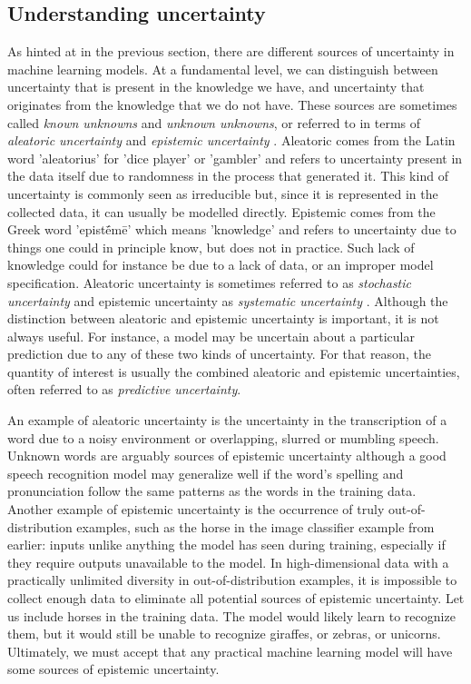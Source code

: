 \subsection{Understanding uncertainty} \label{subsec:understanding-uncertainty}
% 
% 
As hinted at in the previous section, there are different sources of uncertainty in machine learning models. 
At a fundamental level, we can distinguish between uncertainty that is present in the knowledge we have, and uncertainty that originates from the knowledge that we do not have.
These sources are sometimes called \emph{known unknowns} and \emph{unknown unknowns}, or referred to in terms of \textit{aleatoric uncertainty} and \textit{epistemic uncertainty} \parencite{kendall_what_2017}. 
Aleatoric comes from the Latin word 'aleatorius' for 'dice player' or 'gambler' and refers to uncertainty present in the data itself due to randomness in the process that generated it. This kind of uncertainty is commonly seen as irreducible but, since it is represented in the collected data, it can usually be modelled directly. 
Epistemic comes from the Greek word 'epistḗmē' which means 'knowledge' and refers to uncertainty due to things one could in principle know, but does not in practice. Such lack of knowledge could for instance be due to a lack of data, or an improper model specification. 
Aleatoric uncertainty is sometimes referred to as \textit{stochastic uncertainty} and epistemic uncertainty as \textit{systematic uncertainty} \parencite{kendall_what_2017}. 
Although the distinction between aleatoric and epistemic uncertainty is important, it is not always useful. For instance, a model may be uncertain about a particular prediction due to any of these two kinds of uncertainty. For that reason, the quantity of interest is usually the combined aleatoric and epistemic uncertainties, often referred to as \textit{predictive uncertainty}. 

An example of aleatoric uncertainty is the uncertainty in the transcription of a word due to a noisy environment or overlapping, slurred or mumbling speech. 
Unknown words are arguably sources of epistemic uncertainty although a good speech recognition model may generalize well if the word's spelling and pronunciation follow the same patterns as the words in the training data. Another example of epistemic uncertainty is the occurrence of truly out-of-distribution examples, such as the horse in the image classifier example from earlier: inputs unlike anything the model has seen during training, especially if they require outputs unavailable to the model. 
In high-dimensional data with a practically unlimited diversity in out-of-distribution examples, it is impossible to collect enough data to eliminate all potential sources of epistemic uncertainty. Let us include horses in the training data. The model would likely learn to recognize them, but it would still be unable to recognize giraffes, or zebras, or unicorns. 
Ultimately, we must accept that any practical machine learning model will have some sources of epistemic uncertainty. 

